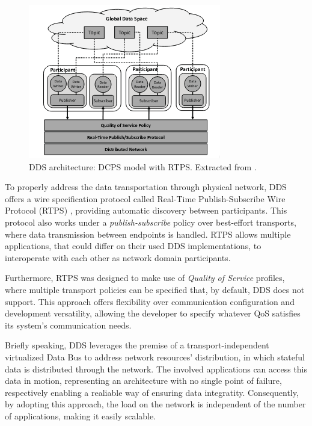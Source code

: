 \begin{figure}[H]
    \centering
    \includegraphics[width=0.6\linewidth]{images/dcps-model.png}
    \caption{DDS architecture: DCPS model with RTPS. Extracted from \cite{maruyama2016exploring}.}
    \label{fig:dcps-model}
\end{figure}

To properly address the data transportation through physical network, DDS offers a wire specification protocol called Real-Time Publish-Subscribe Wire Protocol (RTPS) \cite{rtps}, providing automatic discovery between participants. This protocol also works under a \textit{publish-subscribe} policy over best-effort transports, where data transmission between endpoints is handled. \cite{yun2017data} RTPS allows multiple applications, that could differ on their used DDS implementations, to interoperate with each other as network domain participants. \cite{dcps-rtps, alaerjan2017modeling}

Furthermore, RTPS was designed to make use of \textit{Quality of Service} profiles, where multiple transport policies can be specified that, by default, DDS does not support. This approach offers flexibility over communication configuration and development versatility, allowing the developer to specify whatever QoS satisfies its system's communication needs. \cite{alaerjan2017modeling, diluoffo2018robot, maruyama2016exploring} 

Briefly speaking, DDS leverages the premise of a transport-independent virtualized Data Bus to address network resources' distribution, in which stateful data is distributed through the network. The involved applications can access this data in motion, representing an architecture with no single point of failure, respectively enabling a realiable way of ensuring data integratity. Consequently, by adopting this approach, the load on the network is independent of the number of applications, making it easily scalable.

